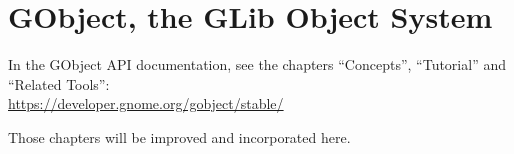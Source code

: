 \chapter{GObject, the GLib Object System}
\label{gobject}

In the GObject API documentation, see the chapters ``Concepts'', ``Tutorial'' and ``Related Tools'':\\
\url{https://developer.gnome.org/gobject/stable/}

Those chapters will be improved and incorporated here.
